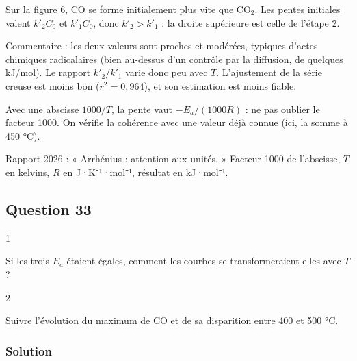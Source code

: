 \documentclass[11pt,a4paper]{article}
\newcommand{\equationajustee}[1]{%
  \sbox{\boiteequation}{$\displaystyle #1$}%
  \ifdim\wd\boiteequation>\linewidth
    \[\resizebox{\linewidth}{!}{\usebox{\boiteequation}}\]%
  \else
    \[#1\]%
  \fi}
\begin{document}
Sur la figure 6, CO se forme initialement plus vite que CO\(_2\). Les pentes initiales valent \(k'_2C_0\) et \(k'_1C_0\), donc \(k'_2>k'_1\) : la droite supérieure est celle de l'étape 2.

\equationajustee{\boxed{\begin{aligned}
E_{a2}&\approx92\ \mathrm{kJ\,mol^{-1}}\\
E_{a1}&\approx86\ \mathrm{kJ\,mol^{-1}}
\end{aligned}}}

Commentaire : les deux valeurs sont proches et modérées, typiques d'actes chimiques radicalaires (bien au-dessus d'un contrôle par la diffusion, de quelques kJ/mol). Le rapport \(k'_2/k'_1\) varie donc peu avec \(T\). L'ajustement de la série creuse est moins bon (\(r^2=0{,}964\)), et son estimation est moins fiable.

\begin{methode}

Avec une abscisse \(1000/T\), la pente vaut \(-E_a/(1000R)\) : ne pas oublier le facteur 1000. On vérifie la cohérence avec une valeur déjà connue (ici, la somme à 450 °C).

\end{methode}

\begin{jury}

Rapport 2026 : « Arrhénius : attention aux unités. » Facteur 1000 de l'abscisse, \(T\) en kelvins, \(R\) en J·K⁻¹·mol⁻¹, résultat en kJ·mol⁻¹.

\end{jury}

\hypertarget{question-33}{%
\subsection{Question 33}\label{question-33}}

\begin{indication}{1}

Si les trois \(E_a\) étaient égales, comment les courbes se transformeraient-elles avec \(T\) ?

\end{indication}

\begin{indication}{2}

Suivre l'évolution du maximum de CO et de sa disparition entre 400 et 500 °C.

\end{indication}

\hypertarget{solution-32}{%
\subsubsection{Solution}\label{solution-32}}
\end{document}
